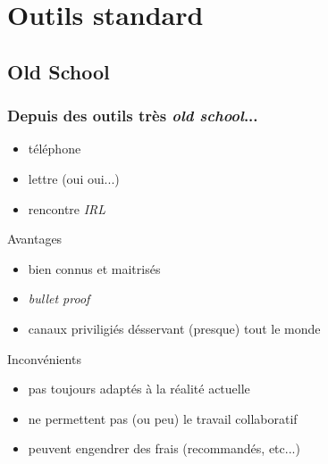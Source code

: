 \documentclass{beamer}
\begin{document}
\section{Outils standard} %

\subsection{Old School} %

\begin{frame}
    \frametitle{Depuis des outils très \textit{old school}...}

    \pause{}

    \begin{itemize}
        \item téléphone
        \item lettre (oui oui...)
        \item rencontre \textit{IRL}
    \end{itemize}
\end{frame}

\begin{frame}
    \begin{block}{Avantages}
    \begin{itemize}
        \item bien connus et maitrisés
        \item \textit{bullet proof}
        \item canaux priviligiés désservant (presque) tout le monde
    \end{itemize}
    \end{block}

    \pause{}

    \begin{block}{Inconvénients}
    \begin{itemize}
        \item pas toujours adaptés à la réalité actuelle
        \item ne permettent pas (ou peu) le travail collaboratif
        \item peuvent engendrer des frais (recommandés, etc...)
    \end{itemize}
    \end{block}

\end{frame}
\end{document}
